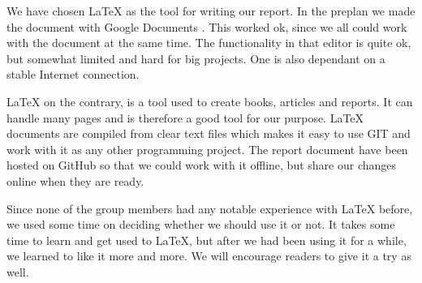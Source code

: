 We have chosen \LaTeX{} as the tool for writing our report. In the preplan we
made the document with Google Documents \cite{GoogleDrive}. This worked ok, since
we all could work with the document at the same time. The functionality in that
editor is quite ok, but somewhat limited and hard for big projects. One is
also dependant on a stable Internet connection. 

\LaTeX{} on the contrary, is a tool used to create books, articles and reports.
It can handle many pages and is therefore a good tool for our purpose. \LaTeX{}
documents are compiled from clear text files which makes it easy to use GIT and
work with it as any other programming project. The report document have been hosted
on GitHub so that we could work with it offline, but share our changes online
when they are ready.

Since none of the group members had any notable experience with \LaTeX{} 
before, we used some time on deciding whether we should use it or not. It takes
some time to learn and get used to \LaTeX{}, but after we had been using it for
a while, we learned to like it more and more. We will encourage readers to give
it a try as well.